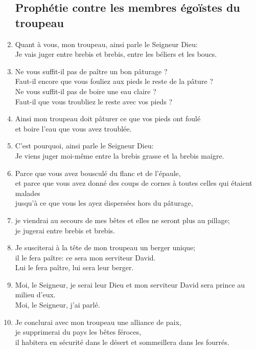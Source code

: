 \begin{enumerate}[leftmargin=\psleftmargin, labelsep = \pslabelsep, label={\arabic*}, font=\color{\pscolor}\small\textsuperscript, parsep=0em, itemsep=0em, topsep=0em ]
          \subsection*{Prophétie contre les membres égoïstes du troupeau}
    \item Quant à vous, mon troupeau, ainsi parle le Seigneur Dieu: \\ Je vais juger entre brebis et brebis, entre les béliers et les boucs.
    \item Ne vous suffit-il pas de paître un bon pâturage ? \\ Faut-il encore que vous fouliez aux pieds le reste de la pâture ? \\ Ne vous suffit-il pas de boire une eau claire ? \\ Faut-il que vous troubliez le reste avec vos pieds ?
    \item Ainsi mon troupeau doit pâturer ce que vos pieds ont foulé \\ et boire l’eau que vous avez troublée. \verseSpace
    \item C’est pourquoi, ainsi parle le Seigneur Dieu: \\ Je viens juger moi-même entre la brebis grasse et la brebis maigre.
    \item Parce que vous avez bousculé du flanc et de l’épaule, \\ et parce que vous avez donné des coups de cornes à toutes celles qui étaient malades \\ jusqu’à ce que vous les ayez dispersées hors du pâturage,
    \item je viendrai au secours de mes bêtes et elles ne seront plus au pillage; \\ je jugerai entre brebis et brebis.
    \item Je susciterai à la tête de mon troupeau un berger unique; \\ il le fera paître: ce sera mon serviteur David. \\ Lui le fera paître, lui sera leur berger.
    \item Moi, le Seigneur, je serai leur Dieu et mon serviteur David sera prince au milieu d’eux. \\ Moi, le Seigneur, j’ai parlé.
    \item Je conclurai avec mon troupeau une alliance de paix, \\ je supprimerai du pays les bêtes féroces, \\ il habitera en sécurité dans le désert et sommeillera dans les fourrés.

\end{enumerate}
